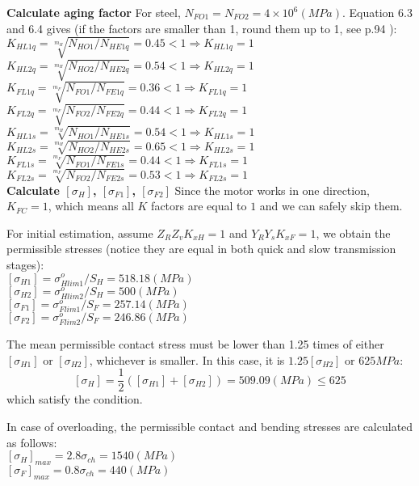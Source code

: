 \textbf{Calculate aging factor} 
For steel, $ N_{FO1}= N_{FO2}= 4\times10^6\unit{(MPa)}$. Equation 6.3 and 6.4 \cite{tk1}  gives (if the factors are smaller than 1, round them up to 1, see p.94 \cite{tk1}):\\
$ K_{HL1q} = \sqrt[m_H]{N_{HO1}/N_{HE1q}} = 0.45 < 1 \Rightarrow K_{HL1q} = 1$\\
$ K_{HL2q} = \sqrt[m_H]{N_{HO2}/N_{HE2q}} = 0.54 < 1 \Rightarrow K_{HL2q} = 1$\\
$ K_{FL1q} = \sqrt[m_F]{N_{FO1}/N_{FE1q}} = 0.36 < 1 \Rightarrow K_{FL1q} = 1$\\
$ K_{FL2q} = \sqrt[m_F]{N_{FO2}/N_{FE2q}} = 0.44 < 1 \Rightarrow K_{FL2q} = 1$\\
$ K_{HL1s} = \sqrt[m_H]{N_{HO1}/N_{HE1s}} = 0.54 < 1 \Rightarrow K_{HL1s} = 1$\\
$ K_{HL2s} = \sqrt[m_H]{N_{HO2}/N_{HE2s}} = 0.65 < 1 \Rightarrow K_{HL2s} = 1$\\
$ K_{FL1s} = \sqrt[m_F]{N_{FO1}/N_{FE1s}} = 0.44 < 1 \Rightarrow K_{FL1s} = 1$\\
$ K_{FL2s} = \sqrt[m_F]{N_{FO2}/N_{FE2s}} = 0.53 < 1 \Rightarrow K_{FL2s} = 1$\\

\textbf{Calculate $ [{\sigma}_H] $, $ [{\sigma}_{F1}] $, $ [{\sigma}_{F2}] $}
Since the motor works in one direction, $ K_{FC} = 1$, which means all $ K $ factors are equal to $ 1 $ and we can safely skip them.

For initial estimation, assume $ Z_RZ_vK_{xH} = 1 $ and $ Y_RY_sK_{xF} = 1 $, we obtain the permissible stresses (notice they are equal in both quick and slow transmission stages):\\
$ [{\sigma}_{H1}] = \sigma_{Hlim1}^o/S_{H} = 518.18 \unit{(MPa)}$\\
$ [{\sigma}_{H2}] = \sigma_{Hlim2}^o/S_{H} = 500 \unit{(MPa)}$\\
$ [{\sigma}_{F1}] = \sigma_{Flim1}^o/S_{F} = 257.14\unit{(MPa)}$\\
$ [{\sigma}_{F2}] = \sigma_{Flim2}^o/S_{F} = 246.86 \unit{(MPa)}$

The mean permissible contact stress must be lower than 1.25 times of either $ [{\sigma}_{H1}] $ or $ [{\sigma}_{H2}] $, whichever is smaller. In this case, it is $ 1.25[{\sigma}_{H2}]$ or $ 625\unit{MPa} $:
\[[{\sigma}_{H}] =\dfrac{1}{2}\left( [{\sigma}_{H1}]+[{\sigma}_{H2}]\right)  = 509.09 \unit{(MPa)}\leq 625\]
which satisfy the condition.

In case of overloading, the permissible contact and bending stresses are calculated as follows:\\
$ [{\sigma}_H]_{max} = 2.8\sigma_{ch} = 1540\unit{(MPa)} $\\
$ [{\sigma}_F]_{max} = 0.8\sigma_{ch} = 440\unit{(MPa)} $



